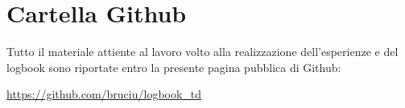 
















\tableofcontents

\section{Cartella Github}
Tutto il materiale attiente al lavoro volto alla realizzazione dell'esperienze e del logbook sono riportate entro la presente pagina pubblica di Github:
\begin{center}
\textcolor{airforceblue}{\url{https://github.com/bruciu/logbook_td}}

\end{center}

\newpage




%

%




%
%
%
%
%
%
%
